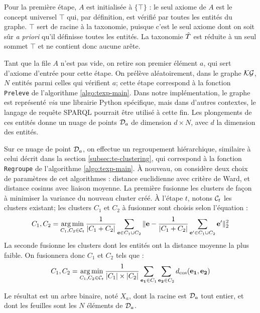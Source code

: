 Pour la première étape, $A$ est initialisée à $\{\top\}$ : le seul axiome de $A$ est le concept universel $\top$ qui, par définition, est vérifié par toutes les entités du graphe. $\top$ sert de racine à la taxonomie, puisque c'est le seul axiome dont on soit sûr \textit{a priori} qu'il définisse toutes les entités.
La taxonomie $\Tpred$ est réduite à un seul sommet $\top$ et ne contient donc aucune arête. 

Tant que la file $A$ n'est pas vide, on retire son premier élément $a$, qui sert d'axiome d'entrée pour cette étape. On prélève aléatoirement, dans le graphe $\KG$, $N$ entités parmi celles qui vérifient $a$; cette étape correspond à la fonction \texttt{Preleve} de l'algorithme \ref{algo:texp-main}. Dans notre implémentation, le graphe est représenté \textit{via} une librairie Python spécifique, mais dans d'autres contextes, le langage de requête SPARQL pourrait être utilisé à cette fin. Les plongements de ces entités donne un nuage de points $\cal{D}_a$ de dimension $d \times N$, avec $d$ la dimension des entités.

Sur ce nuage de point $\cal{D}_a$, on effectue un regroupement hiérarchique, similaire à celui décrit dans la section \ref{subsec:te-clustering}, qui correspond à la fonction \texttt{Regroupe} de l'algorithme \ref{algo:texp-main}. À nouveau, on considère deux choix de paramètres de cet algorithmes : distance euclidienne avec critère de Ward, et distance cosinus avec liaison moyenne. La première fusionne les clusters de façon à minimiser la variance du nouveau cluster créé. À l'étape $t$, notons $\cal{C}_t$ les clusters existant; les clusters $C_1$ et $C_2$ à fusionner sont choisis selon l'équation :
\begin{equation}
    C_1, C_2 = \argmin_{C_1, C_2 \in \cal{C}_t} 
    \frac{1}{| C_1 + C_2 |} \sum_{\bf{e} \in C_1 \cup C_2} \| \bf{e} - \frac{1}{| C_1 + C_2 |} \sum_{\bf{e'} \in C_1 \cup C_2} \bf{e'} \|_2^2 
\end{equation}
La seconde fusionne les clusters dont les entités ont la distance moyenne la plus faible. On fusionnera donc $C_1$ et $C_2$ tels que :
\begin{equation}
    C_1, C_2 = \argmin_{C_1, C_2 \in \cal{C}_t} \frac{1}{|C_1| \times |C_2|} \sum_{\bf{e_1}\in C_1} \sum_{\bf{e_2} \in C_2} d_\text{cos}(\bf{e_1, e_2})
\end{equation}

Le résultat est un arbre binaire, noté $X_a$, dont la racine est $\cal{D}_a$ tout entier, et dont les feuilles sont les $N$ éléments de $\cal{D}_a$. 

